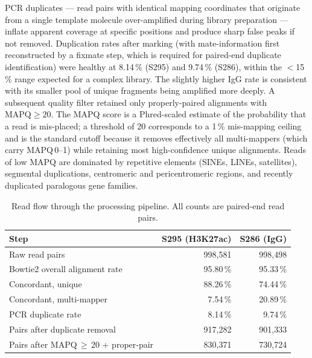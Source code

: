 \documentclass[11pt,a4paper]{article}
\begin{document}
PCR duplicates — read pairs with identical mapping coordinates that originate from a single template molecule over-amplified during library preparation — inflate apparent coverage at specific positions and produce sharp false peaks if not removed. Duplication rates after marking (with mate-information first reconstructed by a fixmate step, which is required for paired-end duplicate identification) were healthy at 8.14\,\% (S295) and 9.74\,\% (S286), within the $<$15\,\% range expected for a complex library. The slightly higher IgG rate is consistent with its smaller pool of unique fragments being amplified more deeply. A subsequent quality filter retained only properly-paired alignments with $\text{MAPQ}\!\geq\!20$. The MAPQ score is a Phred-scaled estimate of the probability that a read is mis-placed; a threshold of 20 corresponds to a 1\,\% mis-mapping ceiling and is the standard cutoff because it removes effectively all multi-mappers (which carry MAPQ\,0--1) while retaining most high-confidence unique alignments. Reads of low MAPQ are dominated by repetitive elements (SINEs, LINEs, satellites), segmental duplications, centromeric and pericentromeric regions, and recently duplicated paralogous gene families.

\begin{table}[h]
\centering
\caption{Read flow through the processing pipeline. All counts are paired-end read pairs.}
\label{tab:pipeline}
\small
\begin{tabular}{lrr}
\toprule
Step & S295 (H3K27ac) & S286 (IgG) \\
\midrule
Raw read pairs                              & 998{,}581 & 998{,}498 \\
Bowtie2 overall alignment rate              & 95.80\,\%  & 95.33\,\%  \\
\;\;Concordant, unique                      & 88.26\,\%  & 74.44\,\%  \\
\;\;Concordant, multi-mapper                & 7.54\,\%   & 20.89\,\%  \\
PCR duplicate rate                          & 8.14\,\%   & 9.74\,\%   \\
Pairs after duplicate removal               & 917{,}282 & 901{,}333 \\
Pairs after MAPQ\,$\geq$\,20 + proper-pair  & 830{,}371 & 730{,}724 \\
\bottomrule
\end{tabular}
\end{table}
\end{document}
